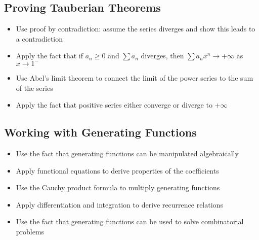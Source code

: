 \subsection*{Proving Tauberian Theorems}
\begin{itemize}
\item Use proof by contradiction: assume the series diverges and show this leads to a contradiction
\item Apply the fact that if $a_n \geq 0$ and $\sum a_n$ diverges, then $\sum a_n x^n \to +\infty$ as $x \to 1^-$
\item Use Abel's limit theorem to connect the limit of the power series to the sum of the series
\item Apply the fact that positive series either converge or diverge to $+\infty$
\end{itemize}

\subsection*{Working with Generating Functions}
\begin{itemize}
\item Use the fact that generating functions can be manipulated algebraically
\item Apply functional equations to derive properties of the coefficients
\item Use the Cauchy product formula to multiply generating functions
\item Apply differentiation and integration to derive recurrence relations
\item Use the fact that generating functions can be used to solve combinatorial problems
\end{itemize}